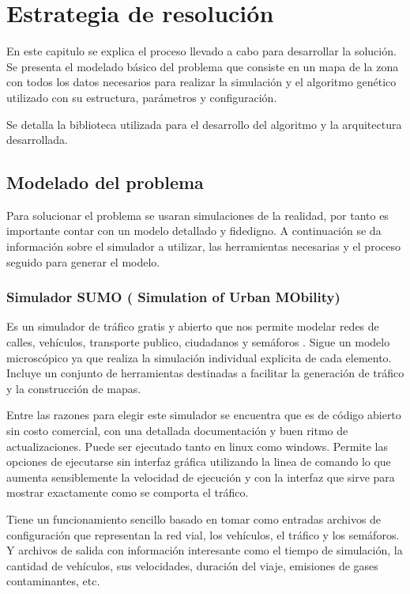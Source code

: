\chapter{Estrategia de resolución}

En este capitulo se explica el proceso llevado a cabo para desarrollar la solución. Se presenta el modelado básico del problema que consiste en un mapa de la zona con todos los datos necesarios para realizar la simulación y el algoritmo genético utilizado con su estructura, parámetros y configuración. 

Se detalla la biblioteca utilizada para el desarrollo del algoritmo y la arquitectura desarrollada.



\section{Modelado del problema }

Para solucionar el problema se usaran simulaciones de la realidad, por tanto es importante contar con un modelo detallado y fidedigno. A continuación se da información sobre el simulador a utilizar, las herramientas necesarias y el proceso seguido para generar el modelo. 

\subsection{Simulador SUMO ( Simulation of Urban MObility)}

Es un simulador de tráfico gratis y abierto que nos permite modelar redes de calles, vehículos, transporte publico, ciudadanos y semáforos \citep{SUMO}. Sigue un modelo microscópico ya que realiza la simulación individual explicita de cada elemento. Incluye un conjunto de herramientas destinadas  a facilitar la generación de tráfico y la construcción de mapas. 

Entre las razones para elegir este simulador se encuentra que es de código abierto sin costo comercial, con una detallada documentación y buen ritmo de actualizaciones. Puede ser ejecutado tanto en linux como windows. Permite las opciones de ejecutarse sin interfaz gráfica utilizando la linea de comando lo que aumenta sensiblemente la velocidad de ejecución y con la interfaz que sirve para mostrar exactamente como se comporta el tráfico.


Tiene un funcionamiento sencillo basado en tomar como entradas archivos de configuración que representan la red vial, los vehículos, el tráfico y los semáforos. Y archivos de salida con información interesante como el tiempo de simulación, la cantidad de vehículos, sus velocidades, duración del viaje, emisiones de gases contaminantes, etc. 

